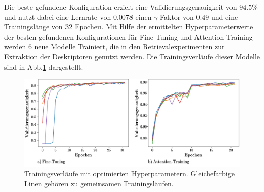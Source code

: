 Die beste gefundene Konfiguration erzielt eine Validierungsgenauigkeit von $94.5\%$ und nutzt dabei eine Lernrate von $0.0078$ einen $\gamma$-Faktor von $0.49$ und eine Trainingslänge von $32$ Epochen. 
Mit Hilfe der ermittelten Hyperparameterwerte der besten gefundenen Konfigurationen für Fine-Tuning und Attention-Training werden $6$ neue Modelle Trainiert, die in den Retrievalexperimenten zur Extraktion der Deskriptoren genutzt werden. Die Trainingsverläufe dieser Modelle sind in Abb.\ref{optimized_runs} dargestellt.
\begin{figure}[h]
\includegraphics[scale=0.75]{NNOPT/6_model_verlauf}
\caption{Trainingsverläufe mit optimierten Hyperparametern. Gleichefarbige Linen gehören zu gemeinsamen Trainingsläufen.}
\label{optimized_runs}
\end{figure}


 